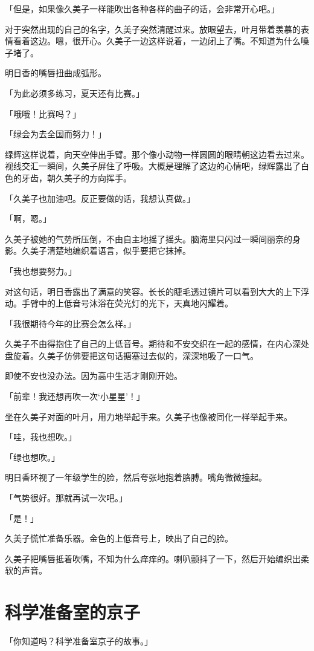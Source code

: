 \documentclass[UTF8]{ctexart}
\begin{document}
    「但是，如果像久美子一样能吹出各种各样的曲子的话，会非常开心吧。」

    对于突然出现的自己的名字，久美子突然清醒过来。放眼望去，叶月带着羡慕的表情看着这边。嗯，很开心。久美子一边这样说着，一边闭上了嘴。不知道为什么嗓子堵了。

    明日香的嘴唇扭曲成弧形。

    「为此必须多练习，夏天还有比赛。」

    「哦哦！比赛吗？」

    「绿会为去全国而努力！」

    绿辉这样说着，向天空伸出手臂。那个像小动物一样圆圆的眼睛朝这边看去过来。视线交汇一瞬间，久美子屏住了呼吸。大概是理解了这边的心情吧，绿辉露出了白色的牙齿，朝久美子的方向挥手。

    「久美子也加油吧。反正要做的话，我想认真做。」

    「啊，嗯。」

    久美子被她的气势所压倒，不由自主地摇了摇头。脑海里只闪过一瞬间丽奈的身影。久美子清楚地编织着语言，似乎要把它抹掉。

    「我也想要努力。」

    对这句话，明日香露出了满意的笑容。长长的睫毛透过镜片可以看到大大的上下浮动。手臂中的上低音号沐浴在荧光灯的光下，天真地闪耀着。

    「我很期待今年的比赛会怎么样。」

    久美子不由得抱住了自己的上低音号。期待和不安交织在一起的感情，在内心深处盘旋着。久美子仿佛要把这句话搪塞过去似的，深深地吸了一口气。

    即使不安也没办法。因为高中生活才刚刚开始。

    「前辈！我还想再吹一次‘小星星’！」

    坐在久美子对面的叶月，用力地举起手来。久美子也像被同化一样举起手来。

    「哇，我也想吹。」

    「绿也想吹。」

    明日香环视了一年级学生的脸，然后夸张地抱着胳膊。嘴角微微擡起。

    「气势很好。那就再试一次吧。」

    「是！」

    久美子慌忙准备乐器。金色的上低音号上，映出了自己的脸。

    久美子把嘴唇抵着吹嘴，不知为什么痒痒的。喇叭颤抖了一下，然后开始编织出柔软的声音。
    \section{科学准备室的京子}
    「你知道吗？科学准备室京子的故事。」
\end{document}
